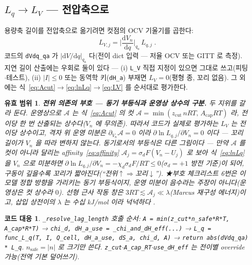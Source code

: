 \documentclass[11pt,a4paper]{article}
\newtheorem*{codebox}{코드 대응}
\newtheorem*{boundbox}{유효 범위}
\newcommand{\dd}{\mathrm{d}}
\newcommand{\code}[1]{\texttt{#1}}
\begin{document}
\subsection{$L_q\to L_V$ — 전압축으로}
용량축 길이를 전압축으로 옮기려면 컷점의 OCV 기울기를 곱한다:
\begin{equation}
\boxed{\;L_{V,j}=\Big|\frac{\dd V_n}{\dd q}\Big|_{q_a}\,L_{q,j}\;.}
\label{eq:LV}
\end{equation}
코드의 \code{dVdq\_qa} 가 $|\dd V/\dd q|_{q_a}$ 다(전이 dict 입력 — 저율 OCV 또는 GITT \cite{weppner1977} 로 측정). 지연 길이 산출에는 우회로 둘이 있다 — (i) \code{L\_V} 직접 지정이 있으면 그대로 쓰고(피팅$\cdot$테스트), (ii) $|I|\le0$ 또는 동역학 키(\code{dH\_a}) 부재면 $L_V=0$(평형 종, 꼬리 없음). 그 외에는 식~\eqref{eq:Acut}$\to$\eqref{eq:lnLq}$\to$\eqref{eq:LV} 를 순서대로 평가한다.

\begin{boundbox}
\textbf{전위 의존의 부호 — 동기 부등식과 운영상 상수의 구분.} 두 지위를 갈라 둔다. \emph{운영상}으로 $\mathcal A$ 는 식~\eqref{eq:Acut} 의 \emph{컷} $\mathcal A=\min(z_\mathrm{cut}\,nRT,\,A_\mathrm{cap}RT)$ 라, 전이당 한 번 산출되는 \emph{상수}다($V_n$ 에 무의존). 따라서 코드가 실제로 평가하는 $L_V$ 는 전이당 상수이고, 격자 위 운영 미분은 $\partial_{V_n}\mathcal A=0$ 이라 $\partial\ln L_{q,j}/\partial V_n=0$ 이다 — 꼬리 길이가 $V_n$ 을 따라 변하지 않는다. \emph{동기}로서의 부등식은 다른 그림이다 — 만약 $\mathcal A$ 를 컷이 아니라 달리는 affinity~\eqref{eq:affinity} $\mathcal A_j=\sigma_dF(V_n-U_j)$ 로 보아 식~\eqref{eq:lnLq} 을 $V_n$ 으로 미분하면 $\partial\ln L_{q,j}/\partial V_n=-\chi_d\sigma_dF/RT\le0$($\sigma_d=+1$ 방전 기준)이 되어, 구동이 깊을수록 꼬리가 짧아진다(``전위$\uparrow\Rightarrow$꼬리$\downarrow$''). ★부호 체크리스트 6번은 이 \emph{모델 정합 방향}을 가리키는 동기 부등식이지, 운영 미분이 음수라는 주장이 아니다(운영상은 컷 상수라 $0$). 선형 근사 작동 창은 $3RT\lesssim\mathcal A_j\ll\lambda$(Marcus 재구성 에너지)이고, 삽입 상전이의 $\lambda$ 는 수십 kJ/mol 이라 넉넉하다 \cite{marcus1956}.
\end{boundbox}

\begin{codebox}
\code{\_resolve\_lag\_length} 호출 순서: \code{A = min(z\_cut*n\_safe*R*T, A\_cap*R*T)} → \code{chi\_d, dH\_a\_use = \_chi\_and\_dH\_eff(...)} → \code{L\_q = func\_L\_q(T, I, Q\_cell, dH\_a\_use, dS\_a, chi\_d, A)} → \code{return abs(dVdq\_qa) * L\_q}. $n_\mathrm{safe}=|n|$ 로 크기만 쓴다. \code{z\_cut}$\cdot$\code{A\_cap\_RT}$\cdot$\code{use\_dH\_eff} 는 전이별 override 가능(전역 기본 덮어쓰기).
\end{codebox}
\end{document}
